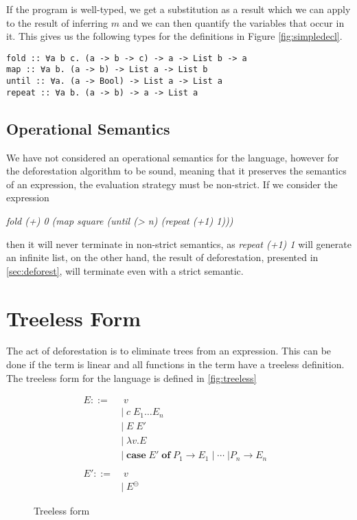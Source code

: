 \documentclass[a4paper, openany]{article}
\begin{document}
If the program is well-typed, we get a substitution as a result which we can apply to the result of inferring \(m\) and we can then quantify the variables that occur in it. This gives us the following types for the definitions in Figure \ref{fig:simpledecl}.
\begin{lstlisting}
fold :: ∀a b c. (a -> b -> c) -> a -> List b -> a
map :: ∀a b. (a -> b) -> List a -> List b
until :: ∀a. (a -> Bool) -> List a -> List a
repeat :: ∀a b. (a -> b) -> a -> List a
\end{lstlisting}

\subsection{Operational Semantics}
\label{sec:orgfdd92f9}
We have not considered an operational semantics for the language, however for the deforestation algorithm to be sound, meaning that it preserves the semantics of an expression, the evaluation strategy must be non-strict. If we consider the expression

\emph{fold (+) 0 (map square (until (> n) (repeat (+1) 1)))}

then it will never terminate in non-strict semantics, as \emph{repeat (+1) 1} will generate an infinite list, on the other hand, the result of deforestation, presented in \ref{sec:deforest}, will terminate even with a strict semantic.

\section{Treeless Form}
\label{sec:orgd69853b}
The act of deforestation is to eliminate trees from an expression. This can be done if the term is linear and all functions in the term have a treeless definition. The treeless form for the language is defined in \autoref{fig:treeless}

\begin{figure}[h!]
\begin{align*}
E ::=& \; v\\
& | \; c \; E_1 \dots E_n \\
& | \; E \; E'\\
& | \; \lambda v. E\\
& | \; \textbf{case} \; E' \; \textbf{of} \; P_1 \rightarrow E_1 \; | \; \cdots \; | P_n \rightarrow E_n\\
&&\\
E' ::=& \; v \\
& | \; E^{\ominus}
\end{align*}
\caption{Treeless form}
\label{fig:treeless}
\end{figure}
\end{document}
